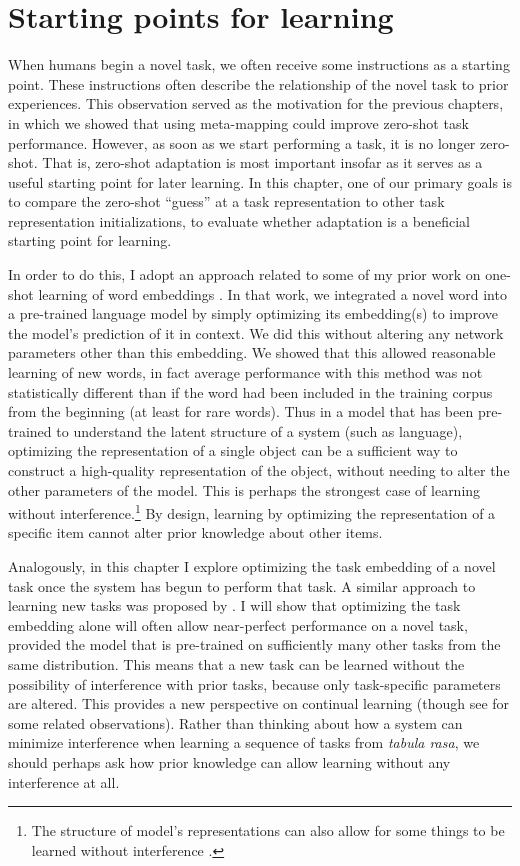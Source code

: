 \section{Starting points for learning}

When humans begin a novel task, we often receive some instructions as a starting point. These instructions often describe the relationship of the novel task to prior experiences. This observation served as the motivation for the previous chapters, in which we showed that using meta-mapping could improve zero-shot task performance. However, as soon as we start performing a task, it is no longer zero-shot. That is, zero-shot adaptation is most important insofar as it serves as a useful starting point for later learning. In this chapter, one of our primary goals is to compare the zero-shot ``guess'' at a task representation to other task representation initializations, to evaluate whether adaptation is a beneficial starting point for learning. \par 
In order to do this, I adopt an approach related to some of my prior work on one-shot learning of word embeddings \citep{Lampinen2018a}. In that work, we integrated a novel word into a pre-trained language model by simply optimizing its embedding(s) to improve the model's prediction of it in context. We did this without altering any network parameters other than this embedding. We showed that this allowed reasonable learning of new words, in fact average performance with this method was not statistically different than if the word had been included in the training corpus from the beginning (at least for rare words). Thus in a model that has been pre-trained to understand the latent structure of a system (such as language), optimizing the representation of a single object can be a sufficient way to construct a high-quality representation of the object, without needing to alter the other parameters of the model. This is perhaps the strongest case of learning without interference.\footnote{The structure of model's representations can also allow for some things to be learned without interference \citep{McClelland2020}.} By design, learning by optimizing the representation of a specific item cannot alter prior knowledge about other items.\par
Analogously, in this chapter I explore optimizing the task embedding of a novel task once the system has begun to perform that task. A similar approach to learning new tasks was proposed by \citet{Reed2015}. I will show that optimizing the task embedding alone will often allow near-perfect performance on a novel task, provided the model that is pre-trained on sufficiently many other tasks from the same distribution. This means that a new task can be learned without the possibility of interference with prior tasks, because only task-specific parameters are altered. This provides a new perspective on continual learning (though see \citep{Oswald2020} for some related observations). Rather than thinking about how a system can minimize interference when learning a sequence of tasks from \emph{tabula rasa}, we should perhaps ask how prior knowledge can allow learning without any interference at all. \par 
